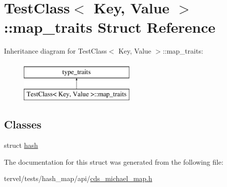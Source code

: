 \hypertarget{struct_test_class_1_1map__traits}{}\section{Test\+Class$<$ Key, Value $>$\+:\+:map\+\_\+traits Struct Reference}
\label{struct_test_class_1_1map__traits}
Inheritance diagram for Test\+Class$<$ Key, Value $>$\+:\+:map\+\_\+traits\+:\begin{figure}[H]
\begin{center}
\leavevmode
\includegraphics[height=2.000000cm]{struct_test_class_1_1map__traits}
\end{center}
\end{figure}
\subsection*{Classes}
\begin{DoxyCompactItemize}
\item 
struct \hyperlink{struct_test_class_1_1map__traits_1_1hash}{hash}
\end{DoxyCompactItemize}


The documentation for this struct was generated from the following file\+:\begin{DoxyCompactItemize}
\item 
tervel/tests/hash\+\_\+map/api/\hyperlink{cds__michael__map_8h}{cds\+\_\+michael\+\_\+map.\+h}\end{DoxyCompactItemize}
